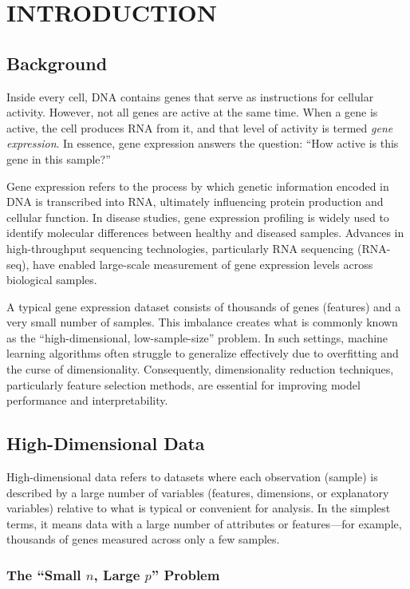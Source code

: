 \chapter{INTRODUCTION}

\section{Background}

Inside every cell, DNA contains genes that serve as instructions for cellular activity. However, not all genes are active at the same time. When a gene is active, the cell produces RNA from it, and that level of activity is termed \textit{gene expression}. In essence, gene expression answers the question: ``How active is this gene in this sample?''

Gene expression refers to the process by which genetic information encoded in DNA is transcribed into RNA, ultimately influencing protein production and cellular function. In disease studies, gene expression profiling is widely used to identify molecular differences between healthy and diseased samples. Advances in high-throughput sequencing technologies, particularly RNA sequencing (RNA-seq), have enabled large-scale measurement of gene expression levels across biological samples.

A typical gene expression dataset consists of thousands of genes (features) and a very small number of samples. This imbalance creates what is commonly known as the ``high-dimensional, low-sample-size'' problem. In such settings, machine learning algorithms often struggle to generalize effectively due to overfitting and the curse of dimensionality. Consequently, dimensionality reduction techniques, particularly feature selection methods, are essential for improving model performance and interpretability.

\section{High-Dimensional Data}

High-dimensional data refers to datasets where each observation (sample) is described by a large number of variables (features, dimensions, or explanatory variables) relative to what is typical or convenient for analysis. In the simplest terms, it means data with a large number of attributes or features---for example, thousands of genes measured across only a few samples.

\subsection{The ``Small $n$, Large $p$'' Problem}

